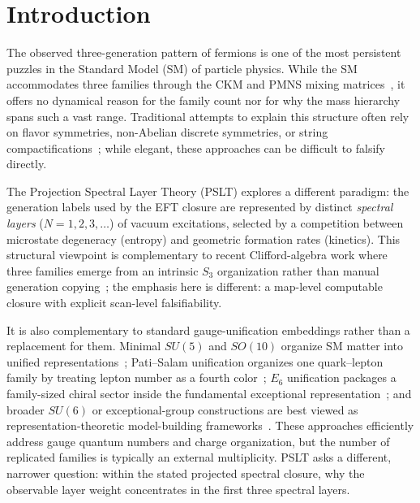\documentclass[aps,prd,onecolumn,notitlepage,nofootinbib,superscriptaddress,11pt,floatfix]{revtex4-2}
\begin{document}
\maketitle
\tableofcontents
\newpage

\section{Introduction}
\label{sec:intro}

The observed three-generation pattern of fermions is one of the most persistent puzzles in the Standard Model (SM) of particle physics. While the SM accommodates three families through the CKM and PMNS mixing matrices~\cite{Cabibbo1963,KobayashiMaskawa1973,MakiNakagawaSakata1962,PDG2024}, it offers no dynamical reason for the family count nor for why the mass hierarchy spans such a vast range. Traditional attempts to explain this structure often rely on flavor symmetries, non-Abelian discrete symmetries, or string compactifications~\cite{FroggattNielsen1979,AltarelliFeruglio2010,Feruglio2015,CandelasHorowitzStromingerWitten1985}; while elegant, these approaches can be difficult to falsify directly.

The Projection Spectral Layer Theory (PSLT) explores a different paradigm: the generation labels used by the EFT closure are represented by distinct \emph{spectral layers} ($N=1,2,3,\dots$) of vacuum excitations, selected by a competition between microstate degeneracy (entropy) and geometric formation rates (kinetics).
This structural viewpoint is complementary to recent Clifford-algebra work where three families emerge from an intrinsic $S_3$ organization rather than manual generation copying~\cite{Gresnigt2026CliffordS3}; the emphasis here is different: a map-level computable closure with explicit scan-level falsifiability.

It is also complementary to standard gauge-unification embeddings rather than a replacement for them.  Minimal \(SU(5)\) and \(SO(10)\) organize SM matter into unified representations~\cite{GeorgiGlashow1974,FritzschMinkowski1975}; Pati--Salam unification organizes one quark--lepton family by treating lepton number as a fourth color~\cite{PatiSalam1974}; \(E_6\) unification packages a family-sized chiral sector inside the fundamental exceptional representation~\cite{GurseyRamondSikivie1976}; and broader \(SU(6)\) or exceptional-group constructions are best viewed as representation-theoretic model-building frameworks~\cite{Slansky1981}.  These approaches efficiently address gauge quantum numbers and charge organization, but the number of replicated families is typically an external multiplicity.  PSLT asks a different, narrower question: within the stated projected spectral closure, why the observable layer weight concentrates in the first three spectral layers.
\end{document}
